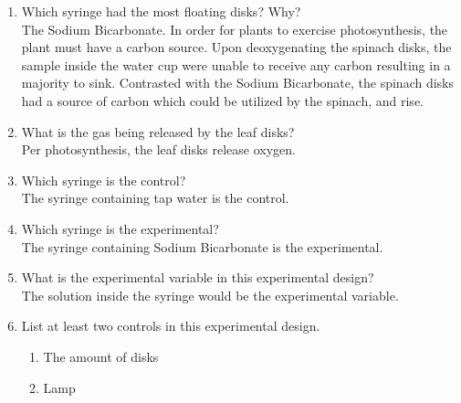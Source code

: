 \documentclass{article}
\begin{document}
\begin{enumerate}[label=\textbf{\arabic*.}]
	\item Which syringe had the most floating disks? Why? \\
		The Sodium Bicarbonate. In order for plants to exercise photosynthesis, the plant must have a carbon source. Upon deoxygenating the spinach disks, the sample inside the water cup were unable to receive any carbon resulting in a majority to sink. Contrasted with the Sodium Bicarbonate, the spinach disks had a source of carbon which could be utilized by the spinach, and rise.
	\item What is the gas being released by the leaf disks? \\
		Per photosynthesis, the leaf disks release oxygen.
	\item Which syringe is the control? \\
		The syringe containing tap water is the control.
	\item Which syringe is the experimental? \\
		The syringe containing Sodium Bicarbonate is the experimental.
	\item What is the experimental variable in this experimental design? \\
		The solution inside the syringe would be the experimental variable.
	\item List at least two controls in this experimental design.
		\begin{enumerate}[label=\textbf{\arabic*.}]
			\item The amount of disks
			\item Lamp
		\end{enumerate}
\end{enumerate}
\end{document}
